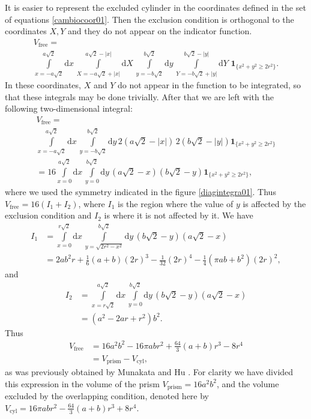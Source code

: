 \documentclass[superscriptaddress,pre,reprint,showpacs,onecolumn]{revtex4-1}
\newcommand{\rd}[1]{\mathrm{d}{#1} \,}
\newcommand{\indicator}[1]{\mathbf{1}_{ \{   #1 \} } }
\begin{document}
It is easier to represent the  
excluded cylinder in the coordinates defined in 
the set of equations \ref{cambiocoor01}. Then the exclusion condition
is orthogonal to the coordinates $X,Y$ and they do not appear
on the indicator function. 
\begin{multline}\label{integraltotal}
 V_\text{free} = \\ \int\limits_{x=-a \sqrt{2}}^{a \sqrt{2}} \rd x 
\int\limits_{X=-a \sqrt{2} + |x| }^{a \sqrt{2} - |x|}  \rd X
 \int\limits_{y=-b \sqrt{2}}^{b \sqrt{2}} \rd y
\int\limits_{Y=-b \sqrt{2} + |y| }^{b \sqrt{2}-|y|}  \rd Y
\, \indicator{ x^2 + y^2 \ge 2r^2  }.
\end{multline}
In these coordinates, $X$ and $Y$ do not appear in the function to be
integrated, 
so that these integrals may be done trivially. After that we are left 
with the  following two-dimensional integral:
\begin{multline}
 V_\text{free}  = \\ \int\limits_{x=-a \sqrt{2}}^{a \sqrt{2}} \rd x  \int\limits_{y=-b \sqrt{2}}^{b \sqrt{2}} \rd y
2 \left( a \sqrt{2} - |x| \right) \, 2 \left( b \sqrt{2} - |y| \right) \indicator{ x^2 + y^2 \ge 2r^2 } \\
 = 16 \int\limits_{x=0}^{a \sqrt{2}} \rd x  \int\limits_{y=0}^{b \sqrt{2}} \rd y 
\left( a \sqrt{2} - x \right) \left( b \sqrt{2} - y \right) \indicator{ x^2 + y^2 \ge 2r^2 },
\end{multline}
where we used the symmetry indicated in the figure \ref{diagintegra01}.
Thus $V_\text{free} = 16(I_1 + I_2)$, where $I_1$ is the region where the value of $y$
is affected by the exclusion condition and $I_2$ is where it is not affected
by it. 
We have
\begin{align}
 I_1 &= \int\limits_{x=0}^{r\sqrt{2}} \rd x \int\limits_{y = \sqrt{ 2r^2 - x^2}}^{b \sqrt{2}} \rd y
\left( b \sqrt{2} - y \right)  \left( a \sqrt{2} - x \right) \\
&= 	
2 a b^{2} r  + \textstyle \frac{1}{6} (a+b) (2r)^{3} - \frac{1}{32}  (2r)^{4} - \frac{1}{4} {\left(\pi a b + b^{2}\right)} (2r)^2,
\end{align}
and
\begin{align}
 I_2 &= \int\limits_{x=r  \sqrt{2}}^{a \sqrt{2}} \rd x  \int\limits_{y = 0}^{b \sqrt{2}} \rd y
 \left( b \sqrt{2} - y \right)  \left( a \sqrt{2} - x \right)  \\
&=	
{\left( a^{2} - 2ar +   r^{2}\right)} b^{2}.
\end{align}
Thus 
\begin{align}\label{volumeabd}
 V_\text{free}
 & =  16 a^{2} b^{2}  - 16 \pi a b r^{2} + \textstyle \frac{64}{3} (a+b) r^{3}  - 8 r^{4} \\
&= V_\text{prism} - V_\text{cyl},
\end{align}
as was previously obtained by Munakata and Hu \cite{Munakata02}.
For clarity we have divided this expression in the volume of the prism 
$V_\text{prism}=16 a^2 b^2$, and  the volume excluded by the overlapping
condition, denoted here by 
$V_\text{cyl}=  16 \pi a b r^{2} - \textstyle \frac{64}{3} (a+b) r^{3}  + 8 r^{4}$.
\end{document}
